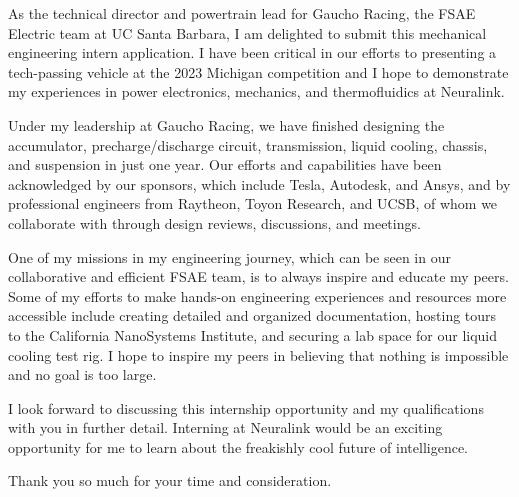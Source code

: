 \documentclass[11pt, letterpaper]{awesome-cv} %
\begin{document}
\makecvheader %

\makelettertitle %


\begin{cvletter}

As the technical director and powertrain lead for Gaucho Racing, the FSAE Electric team at UC Santa Barbara, I am delighted to submit this mechanical engineering intern application. I have been critical in our efforts to presenting a tech-passing vehicle at the 2023 Michigan competition and I hope to demonstrate my experiences in power electronics, mechanics, and thermofluidics at Neuralink. 

Under my leadership at Gaucho Racing, we have finished designing the accumulator, precharge/discharge circuit, transmission, liquid cooling, chassis, and suspension in just one year. Our efforts and capabilities have been acknowledged by our sponsors, which include Tesla, Autodesk, and Ansys, and by professional engineers from Raytheon, Toyon Research, and UCSB, of whom we collaborate with through design reviews, discussions, and meetings. 

One of my missions in my engineering journey, which can be seen in our collaborative and efficient FSAE team, is to always inspire and educate my peers. Some of my efforts to make hands-on engineering experiences and resources more accessible include creating detailed and organized documentation, hosting tours to the California NanoSystems Institute, and securing a lab space for our liquid cooling test rig. I hope to inspire my peers in believing that nothing is impossible and no goal is too large.

I look forward to discussing this internship opportunity and my qualifications with you in further detail. Interning at Neuralink would be an exciting opportunity for me to learn about the freakishly cool future of intelligence. 

Thank you so much for your time and consideration.



\end{cvletter}
\end{document}
